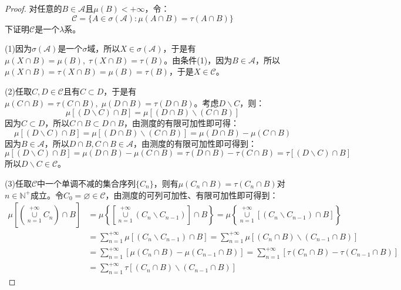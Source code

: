 \begin{proof}
	对任意的$B\in \mathscr{A}$且$\mu(B)<+\infty$，令：
	\begin{equation*}
		\mathscr{C}=\{A\in\sigma(\mathscr{A}):\mu(A\cap B)=\tau(A\cap B)\}
	\end{equation*}
	下证明$\mathscr{C}$是一个$\lambda$系。\par
	(1)因为$\sigma(\mathscr{A})$是一个$\sigma$域，所以$X\in\sigma(\mathscr{A})$，于是有$\mu(X\cap B)=\mu(B),\;\tau(X\cap B)=\tau(B)$。由条件(1)，因为$B\in \mathscr{A}$，所以$\mu(X\cap B)=\tau(X\cap B)=\mu(B)=\tau(B)$，于是$X\in \mathscr{C}$。\par
	(2)任取$C,D\in \mathscr{C}$且有$C\subset D$，于是有$\mu(C\cap B)=\tau(C\cap B),\;\mu(D\cap B)=\tau(D\cap B)$。考虑$D\backslash C$，则：
	\begin{equation*}
		\mu[(D\backslash C)\cap B]=\mu[(D\cap B)\backslash(C\cap B)]
	\end{equation*}
	因为$C\subset D$，所以$C\cap B\subset D\cap B$，由测度的有限可加性即可得：
	\begin{equation*}
		\mu[(D\backslash C)\cap B]=\mu[(D\cap B)\backslash(C\cap B)]=\mu(D\cap B)-\mu(C\cap B)
	\end{equation*}
	因为$B\in \mathscr{A}$，所以$D\cap B,C\cap B\in \mathscr{A}$，由测度的有限可加性即可得到：
	\begin{equation*}
		\mu[(D\backslash C)\cap B]=\mu(D\cap B)-\mu(C\cap B)=\tau(D\cap B)-\tau(C\cap B)=\tau[(D\backslash C)\cap B]
	\end{equation*}
	所以$D\backslash C\in \mathscr{C}$。\par
	(3)任取$\mathscr{C}$中一个单调不减的集合序列$\{C_n\}$，则有$\mu(C_n\cap B)=\tau(C_n\cap B)$对$n\in\mathbb{N}^+$成立。令$C_0=\varnothing\in \mathscr{C}$，由测度的可列可加性、有限可加性即可得到：
	\begin{align*}
		\mu\left[\left(\underset{n=1}{\overset{+\infty}{\cup}}C_n\right)\cap B\right]
		&=\mu\left\{\left[\underset{n=1}{\overset{+\infty}{\cup}}(C_n\backslash C_{n-1})\right]\cap B\right\}
		=\mu\left\{\underset{n=1}{\overset{+\infty}{\cup}}[(C_n\backslash C_{n-1})\cap B]\right\} \\
		&=\sum_{n=1}^{+\infty}\mu[(C_n\backslash C_{n-1})\cap B]
		=\sum_{n=1}^{+\infty}\mu[(C_n\cap B)\backslash (C_{n-1}\cap B)] \\
		&=\sum_{n=1}^{+\infty}[\mu(C_n\cap B)-\mu(C_{n-1}\cap B)]
		=\sum_{n=1}^{+\infty}[\tau(C_n\cap B)-\tau(C_{n-1}\cap B)] \\
		&=\sum_{n=1}^{+\infty}\tau[(C_n\cap B)\backslash (C_{n-1}\cap B)]

\end{align*}
\end{proof}
